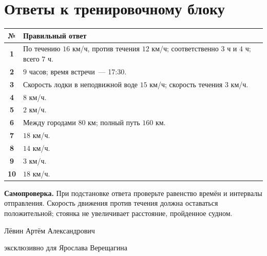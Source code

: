 \documentclass[a4paper,12pt]{article}
\newcommand{\important}[1]{\textcolor{darkaccent}{\textbf{#1}}}
\begin{document}
\clearpage
\section*{Ответы к тренировочному блоку}
\renewcommand{\arraystretch}{1.42}
\begin{center}
\begin{tabularx}{\linewidth}{@{}>{\bfseries\color{accent}}c X@{}}
\toprule
№ & Правильный ответ \\
\midrule
1 & По течению $16$ км/ч, против течения $12$ км/ч; соответственно $3$ ч и $4$ ч; всего $7$ ч. \\
2 & $9$ часов; время встречи~--- 17:30. \\
3 & Скорость лодки в неподвижной воде $15$ км/ч; скорость течения $3$ км/ч. \\
4 & $8$ км/ч. \\
5 & $2$ км/ч. \\
6 & Между городами $80$ км; полный путь $160$ км. \\
7 & $18$ км/ч. \\
8 & $14$ км/ч. \\
9 & $3$ км/ч. \\
10 & $18$ км/ч. \\
\bottomrule
\end{tabularx}
\end{center}
\vspace{11mm}
\noindent\important{Самопроверка.} При подстановке ответа проверьте равенство времён и интервалы отправления. Скорость движения против течения должна оставаться положительной; стоянка не увеличивает расстояние, пройденное судном.
\vfill
\begin{center}
{\small\color{soft} Лёвин Артём Александрович}\par
{\small\color{soft} эксклюзивно для Ярослава Верещагина}
\end{center}
\end{document}
